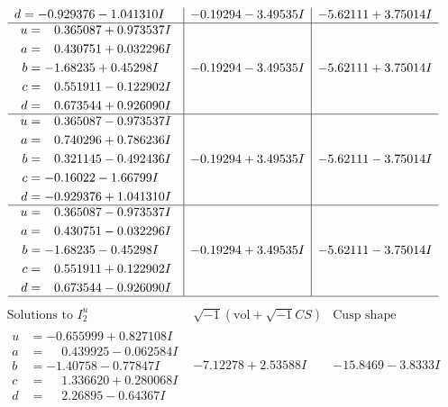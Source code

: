 \documentclass[1p]{elsarticle_modified}
\theoremstyle{definition}
\newcommand{\I}{\sqrt{-1}}
\begin{document}
$$\begin{array}{c|c|c}
\begin{aligned}
d &= -0.929376 - 1.041310 I\end{aligned}
 & -0.19294 - 3.49535 I & -5.62111 + 3.75014 I \\ \hline\begin{aligned}
u &= \phantom{-}0.365087 + 0.973537 I \\
a &= \phantom{-}0.430751 + 0.032296 I \\
b &= -1.68235 + 0.45298 I \\
c &= \phantom{-}0.551911 - 0.122902 I \\
d &= \phantom{-}0.673544 + 0.926090 I\end{aligned}
 & -0.19294 - 3.49535 I & -5.62111 + 3.75014 I \\ \hline\begin{aligned}
u &= \phantom{-}0.365087 - 0.973537 I \\
a &= \phantom{-}0.740296 + 0.786236 I \\
b &= \phantom{-}0.321145 - 0.492436 I \\
c &= -0.16022 - 1.66799 I \\
d &= -0.929376 + 1.041310 I\end{aligned}
 & -0.19294 + 3.49535 I & -5.62111 - 3.75014 I \\ \hline\begin{aligned}
u &= \phantom{-}0.365087 - 0.973537 I \\
a &= \phantom{-}0.430751 - 0.032296 I \\
b &= -1.68235 - 0.45298 I \\
c &= \phantom{-}0.551911 + 0.122902 I \\
d &= \phantom{-}0.673544 - 0.926090 I\end{aligned}
 & -0.19294 + 3.49535 I & -5.62111 - 3.75014 I\\
 \hline 
 \end{array}$$\newpage$$\begin{array}{c|c|c}  
\text{Solutions to }I^u_{2}& \I (\text{vol} + \sqrt{-1}CS) & \text{Cusp shape}\\
 \hline 
\begin{aligned}
u &= -0.655999 + 0.827108 I \\
a &= \phantom{-}0.439925 - 0.062584 I \\
b &= -1.40758 - 0.77847 I \\
c &= \phantom{-}1.336620 + 0.280068 I \\
d &= \phantom{-}2.26895 - 0.64367 I\end{aligned}
 & -7.12278 + 2.53588 I & -15.8469 - 3.8333 I \\ \hline\begin{aligned}

\end{aligned}
\end{array}$$
\end{document}
